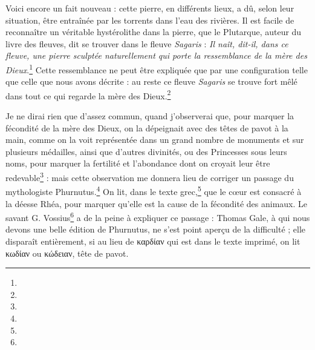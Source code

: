 \documentclass[a4paper, 11pt, oneside, polutonikogreek, french]{article}
\begin{document}
Voici encore un fait nouveau : cette pierre, en différents lieux, a dû, selon leur situation, être entraînée par les torrents dans l'eau des rivières. Il est facile de reconnaître un véritable hystérolithe dans la pierre, que le Plutarque, auteur du livre des fleuves, dit se trouver dans le fleuve \emph{Sagaris} : \emph{Il naît, dit-il, dans ce fleuve, une pierre sculptée naturellement qui porte la ressemblance de la mère des Dieux}.\footnote{} Cette ressemblance ne peut être expliquée que par une configuration telle que celle que nous avons décrite : au reste ce fleuve \emph{Sagaris} se trouve fort mêlé dans tout ce qui regarde la mère des Dieux.\footnote{}

Je ne dirai rien que d'assez commun, quand j'observerai que, pour marquer la fécondité de la mère des Dieux, on la dépeignait avec des têtes de pavot à la main, comme on la voit représentée dans un grand nombre de monuments et sur plusieurs médailles, ainsi que d'autres divinités, ou des Princesses sous leurs noms, pour marquer la fertilité et l'abondance dont on croyait leur être redevable\footnote{} : mais cette observation me donnera lieu de corriger un passage du mythologiste Phurnutus.\footnote{} On lit, dans le texte grec,\footnote{} que le cœur est consacré à la déesse Rhéa, pour marquer qu'elle est la cause de la fécondité des animaux. Le savant G. Vossius\footnote{} a de la peine à expliquer ce passage : Thomas Gale, à qui nous devons une belle édition de Phurnutus, ne s'est point aperçu de la difficulté ; elle disparaît entièrement, si au lieu de καρδίαν qui est dans le texte imprimé, on lit κωδίαν ou κώδειαν, tête de pavot.
\end{document}
